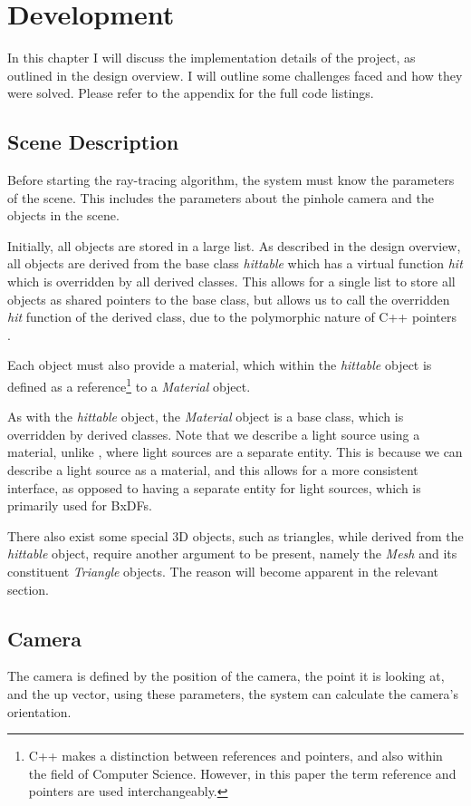 \documentclass[../main.tex]{subfiles}
\begin{document}
\section{Development}
In this chapter I will discuss the implementation details of the project, as outlined
in the design overview. I will outline some challenges faced and how they were solved.
Please refer to the appendix for the full code listings.

\subsection{Scene Description}
Before starting the ray-tracing algorithm, the system must know the parameters of the scene.
This includes the parameters about the pinhole camera and the objects in the scene. 

Initially, all objects are stored in a large list. As described in the design overview, all objects are 
derived from the base class \textit{hittable} which has a virtual function \textit{hit} which is overridden by
all derived classes. This allows for a single list to store all objects as shared pointers to the base class, but allows
us to call the overridden \textit{hit} function of the derived class, due to the polymorphic nature of C++ pointers 
\cite{noauthor_c17_nodate}.

Each object must also provide a material, which within the \textit{hittable} object is defined as a reference\footnote{C++ makes a distinction between references and pointers, and also within the field of 
Computer Science. However, in this paper the term reference and pointers are used interchangeably.} 
to a \textit{Material} object.

As with the \textit{hittable} object, the \textit{Material} object is a base class, which is overridden by derived classes. Note that we describe
a light source using a material, unlike \cite{pharr_physically_2016}, where light sources are a separate entity.
This is because we can describe a light source as a material, and this allows for a more consistent interface, as 
opposed to having a separate entity for light sources, which is primarily used for BxDFs.

There also exist some special 3D objects, such as triangles, while derived from the \textit{hittable} object, require 
another argument to be present, namely the \textit{Mesh} and its constituent \textit{Triangle} objects. The reason will become 
apparent in the relevant section.

\subsection{Camera}
The camera is defined by the position of the camera, the point it is looking at, and the up vector, using these 
parameters, the system can calculate the camera's orientation.
\end{document}

